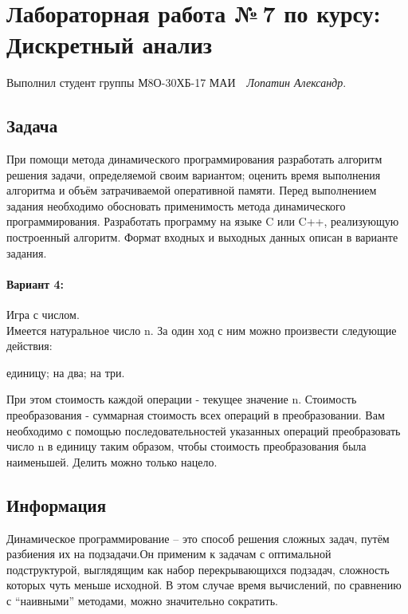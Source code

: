 \documentclass[12pt]{article}
\begin{document}
\section*{\centering Лабораторная работа №\,7 по курсу:\\ Дискретный анализ}

Выполнил студент группы М8О-30ХБ-17 МАИ \,\, \textit{Лопатин Александр}.

\subsection*{Задача}

При помощи метода динамического программирования разработать алгоритм решения задачи, определяемой своим вариантом; оценить время выполнения
алгоритма и объём затрачиваемой оперативной памяти. Перед выполнением задания
необходимо обосновать применимость метода динамического программирования.
Разработать программу на языке C или C++, реализующую построенный алгоритм.
Формат входных и выходных данных описан в варианте задания.

\paragraph*{Вариант 4:} Игра с числом.\\

Имеется натуральное число n. За один ход с ним можно произвести следующие действия:
\begin{itemize}
 единицу;
 на два;
 на три.
\end{itemize}

При этом стоимость каждой операции - текущее значение n. Стоимость преобразования - суммарная
стоимость всех операций в преобразовании. Вам необходимо с помощью последовательностей указанных
операций преобразовать число n в единицу таким образом, чтобы стоимость преобразования была
наименьшей. Делить можно только нацело.\\


\subsection*{Информация}

Динамическое программирование -- это способ решения сложных задач, путём разбиения их на подзадачи.Он применим к задачам с оптимальной подструктурой, выглядящим как набор перекрывающихся подзадач, сложность которых чуть меньше исходной. В этом случае время вычислений, по сравнению с ``наивными'' методами, можно значительно сократить.
\end{document}
